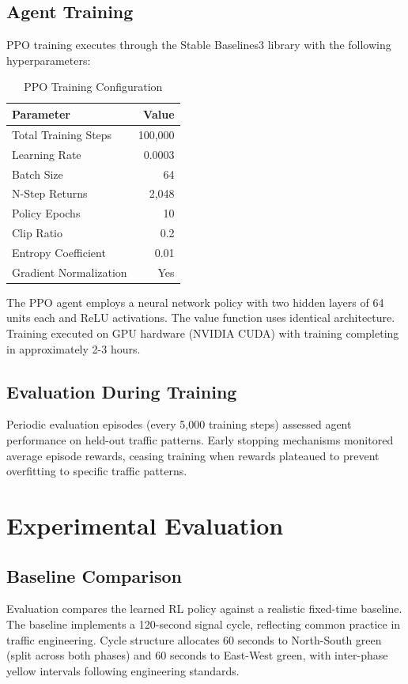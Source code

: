 \documentclass[10pt,conference]{IEEEtran}
\begin{document}
\subsection{Agent Training}

PPO training executes through the Stable Baselines3 library with the following hyperparameters:
\begin{table}[h]
\centering
\caption{PPO Training Configuration}
\begin{tabular}{|l|r|}
\hline
\textbf{Parameter} & \textbf{Value} \\
\hline
Total Training Steps & 100,000 \\
Learning Rate & 0.0003 \\
Batch Size & 64 \\
N-Step Returns & 2,048 \\
Policy Epochs & 10 \\
Clip Ratio & 0.2 \\
Entropy Coefficient & 0.01 \\
Gradient Normalization & Yes \\
\hline
\end{tabular}
\end{table}

The PPO agent employs a neural network policy with two hidden layers of 64 units each and ReLU activations. The value function uses identical architecture. Training executed on GPU hardware (NVIDIA CUDA) with training completing in approximately 2-3 hours.

\subsection{Evaluation During Training}

Periodic evaluation episodes (every 5,000 training steps) assessed agent performance on held-out traffic patterns. Early stopping mechanisms monitored average episode rewards, ceasing training when rewards plateaued to prevent overfitting to specific traffic patterns.

\section{Experimental Evaluation}

\subsection{Baseline Comparison}

Evaluation compares the learned RL policy against a realistic fixed-time baseline. The baseline implements a 120-second signal cycle, reflecting common practice in traffic engineering. Cycle structure allocates 60 seconds to North-South green (split across both phases) and 60 seconds to East-West green, with inter-phase yellow intervals following engineering standards.
\end{document}
